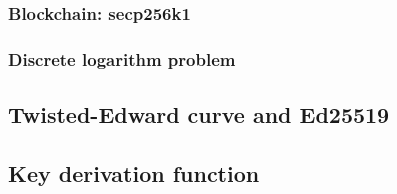 \subsubsection{Blockchain: secp256k1}

\subsubsection{Discrete logarithm problem}

\subsection{Twisted-Edward curve and Ed25519}

\subsection{Key derivation function}

